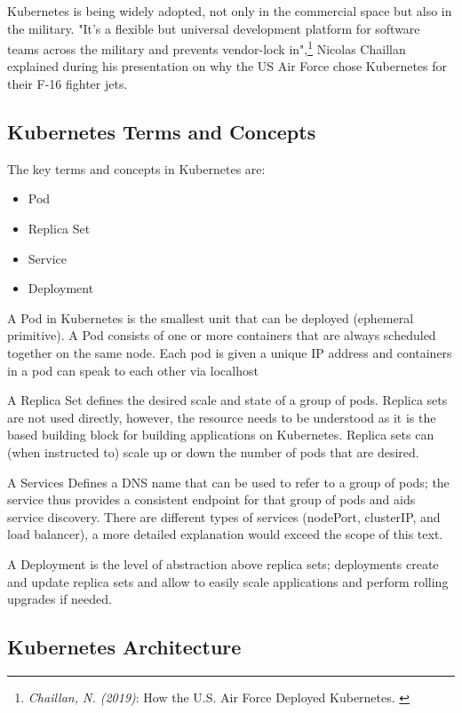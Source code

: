 Kubernetes is being widely adopted, not only in the commercial space but also in the military. "It’s a flexible but universal development platform for software teams across the military and prevents vendor-lock in",\footnote{\textit{Chaillan, N. (2019)}: How the U.S. Air Force Deployed Kubernetes. \cite{airForce}} Nicolas Chaillan explained during his presentation on why the US Air Force chose Kubernetes for their F-16 fighter jets.

\subsection{Kubernetes Terms and Concepts}

The key terms and concepts in Kubernetes are:
\begin{itemize}
\item Pod
\item Replica Set
\item Service
\item Deployment
\end{itemize}

A Pod in Kubernetes is the smallest unit that can be deployed (ephemeral primitive). A Pod consists of one or more containers that are always scheduled together on the same node. Each pod is given a unique IP address and containers in a pod can speak to each other via localhost

A Replica Set defines the desired scale and state of a group of pods. Replica sets are not used directly, however, the resource needs to be understood as it is the based building block for building applications on Kubernetes. Replica sets can (when instructed to) scale up or down the number of pods that are desired.

A Services Defines a DNS name that can be used to refer to a group of pods; the service thus provides a consistent endpoint for that group of pods and aids service discovery. There are different types of services (nodePort, clusterIP, and load balancer), a more detailed explanation would exceed the scope of this text.

A Deployment is the level of abstraction above replica sets; deployments create and update replica sets and allow to easily scale applications and perform rolling upgrades if needed.

\subsection{Kubernetes Architecture}

